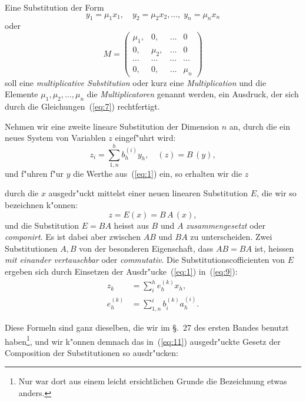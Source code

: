 \documentclass[12pt,a4paper]{article}
\theoremstyle{weber}
\begin{document}
Eine Substitution der Form
\begin{equation}\label{eq:7}
y_1 = \mu_1 x_1,\quad y_2 = \mu_2 x_2, \ldots,\; y_n = \mu_n x_n
\end{equation}
oder
\begin{equation}\label{eq:8}
M = \begin{pmatrix}
\mu_1, & 0, & \ldots & 0 \\
0, & \mu_2, & \ldots & 0 \\
\cdots & \cdots & \cdots & \cdots \\
0, & 0, & \ldots & \mu_n
\end{pmatrix}
\end{equation}
soll eine \textit{multiplicative Substitution} oder kurz eine \textit{Multiplication} und die Elemente $\mu_1, \mu_2, \ldots, \mu_n$ die \textit{Multiplicatoren} genannt werden, ein Ausdruck, der sich durch die Gleichungen~(\ref{eq:7}) rechtfertigt.

Nehmen wir eine zweite lineare Substitution der Dimension $n$ an, durch die ein neues System von Variablen $z$ eingef"uhrt wird:
\begin{equation}\label{eq:9}
z_i = \sum_{1,n}^{h} b_h^{(i)} y_h, \quad (z) = B\,(y),
\end{equation}
und f"uhren f"ur $y$ die Werthe aus~(\ref{eq:1}) ein, so erhalten wir die $z$


durch die $x$ ausgedr"uckt mittelst einer neuen linearen Substitution $E$, die wir so bezeichnen k"onnen:
\begin{equation}\label{eq:10}
z = E(x) = B\,A\,(x),
\end{equation}
und die Substitution $E = BA$ heisst aus $B$ und $A$ \textit{zusammengesetzt} oder \textit{componirt}. Es ist dabei aber zwischen $AB$ und $BA$ zu unterscheiden. Zwei Substitutionen $A, B$ von der besonderen Eigenschaft, dass $AB = BA$ ist, heissen \textit{mit einander vertauschbar} oder \textit{commutativ}. Die Substitutionscofficienten von $E$ ergeben sich durch Einsetzen der Ausdr"ucke~(\ref{eq:1}) in~(\ref{eq:9}):
\begin{equation}\label{eq:11}
\begin{aligned}
z_k &= \sum_{i}^{h} e_h^{(k)} x_h,\\[4pt]
e_h^{(k)} &= \sum_{1,n}^{i} b_i^{(k)} a_h^{(i)}.
\end{aligned}
\end{equation}

Diese Formeln sind ganz dieselben, die wir im \S.~27 des ersten Bandes benutzt haben\footnote{Nur war dort aus einem leicht ersichtlichen Grunde die Bezeichnung etwas anders.}, und wir k"onnen demnach das in~(\ref{eq:11}) ausgedr"uckte Gesetz der Composition der Substitutionen so ausdr"ucken:
\end{document}
